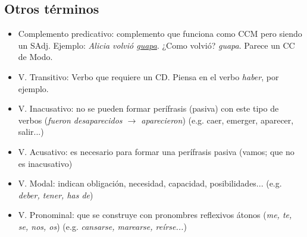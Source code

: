 \documentclass[arial,a4paper,print]{article}
\begin{document}
\subsection{Otros términos}
\begin{itemize}
	
	\item Complemento predicativo: complemento que funciona como CCM pero siendo un SAdj. Ejemplo: \textit{Alicia volvió \underline{guapa}}. ¿Como volvió? \textit{guapa}. Parece un CC de Modo.  
	\item V. Transitivo: Verbo que requiere un CD. Piensa en el verbo \textit{haber}, por ejemplo. 
	
	\item V. Inacusativo: no se pueden formar perífrasis (pasiva) con este tipo de verbos (\textit{fueron desaparecidos $\rightarrow$ aparecieron}) (e.g. caer, emerger, aparecer, salir...)
	
	\item V. Acusativo: es necesario para formar una perífrasis pasiva (vamos; que no es inacusativo)
	
	\item V. Modal: indican obligación, necesidad, capacidad, posibilidades... (e.g. \textit{deber, tener, has de})
	
	\item V. Pronominal: que se construye con pronombres reflexivos átonos (\textit{me, te, se, nos, os}) (e.g. \textit{cansarse, marearse, reírse...})
\end{itemize}
	
\end{document}
